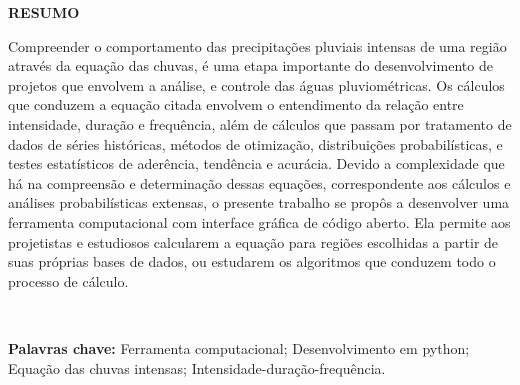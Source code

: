 \thispagestyle{empty}

\singlespacing
\begin{center}
	\textbf{RESUMO}
\end{center}

\noindent Compreender o comportamento das precipitações pluviais intensas de uma região através da equação das chuvas, é uma etapa importante do desenvolvimento de projetos que envolvem a análise, e controle das águas pluviométricas. Os cálculos que conduzem a equação citada envolvem o entendimento da relação entre intensidade, duração e frequência, além de cálculos que passam por tratamento de dados de séries históricas, métodos de otimização, distribuições probabilísticas, e testes estatísticos de aderência, tendência e acurácia. Devido a complexidade que há na compreensão e determinação dessas equações, correspondente aos cálculos e análises probabilísticas extensas, o presente trabalho se propôs a desenvolver uma ferramenta computacional com interface gráfica de código aberto. Ela permite aos projetistas e estudiosos calcularem a equação para regiões escolhidas a partir de suas próprias bases de dados, ou estudarem os algoritmos que conduzem todo o processo de cálculo.

\ \

\noindent \textbf{Palavras chave:} Ferramenta computacional; Desenvolvimento em python; Equação das chuvas intensas; Intensidade-duração-frequência.
\newpage
